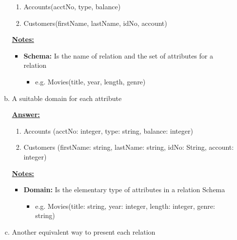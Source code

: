 \documentclass[12pt]{article}
\begin{document}
\begin{enumerate}[1.]
\begin{enumerate}[a)]
\begin{mdframed}
            \begin{enumerate}[1.]
                \item Accounts(acctNo, type, balance)
                \item Customers(firstName, lastName, idNo, account)
            \end{enumerate}
        \end{mdframed}

        \bigskip

        \underline{\textbf{Notes:}}

        \begin{itemize}
            \item \textbf{Schema:} Is the name of relation and the set of attributes
            for a relation

            \begin{itemize}
                \item e.g. Movies(title, year, length, genre)
            \end{itemize}
        \end{itemize}

        \item A suitable domain for each attribute

        \bigskip

        \begin{mdframed}
            \underline{\textbf{Answer:}}

            \begin{enumerate}[1.]
                \item Accounts (acctNo: integer, type: string, balance: integer)
                \item Customers (firstName: string, lastName: string, idNo: String, account: integer)
            \end{enumerate}
        \end{mdframed}

        \underline{\textbf{Notes:}}

        \begin{itemize}
            \item \textbf{Domain:} Is the elementary type of attributes in a
            relation Schema

            \begin{itemize}
                \item e.g. Movies(title: string, year: integer, length: integer, genre: string)
            \end{itemize}
        \end{itemize}
        \item Another equivalent way to present each relation
    \end{enumerate}


\end{enumerate}
\end{document}
